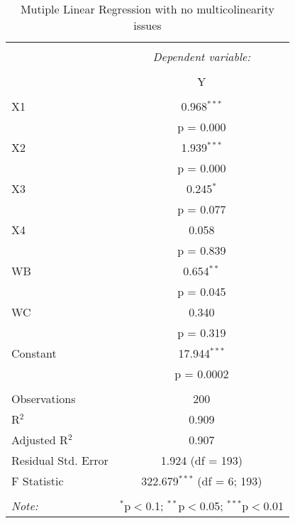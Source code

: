 
\begin{table}[!htbp] \centering 
  \caption{Mutiple Linear Regression with no multicolinearity issues } 
  \label{tab::multi_fixed_1} 
\begin{tabular}{@{\extracolsep{5pt}}lc} 
\\[-1.8ex]\hline 
\hline \\[-1.8ex] 
 & \multicolumn{1}{c}{\textit{Dependent variable:}} \\ 
\cline{2-2} 
\\[-1.8ex] & Y \\ 
\hline \\[-1.8ex] 
 X1 & 0.968$^{***}$ \\ 
  & p = 0.000 \\ 
  X2 & 1.939$^{***}$ \\ 
  & p = 0.000 \\ 
  X3 & 0.245$^{*}$ \\ 
  & p = 0.077 \\ 
  X4 & 0.058 \\ 
  & p = 0.839 \\ 
  WB & 0.654$^{**}$ \\ 
  & p = 0.045 \\ 
  WC & 0.340 \\ 
  & p = 0.319 \\ 
  Constant & 17.944$^{***}$ \\ 
  & p = 0.0002 \\ 
 \hline \\[-1.8ex] 
Observations & 200 \\ 
R$^{2}$ & 0.909 \\ 
Adjusted R$^{2}$ & 0.907 \\ 
Residual Std. Error & 1.924 (df = 193) \\ 
F Statistic & 322.679$^{***}$ (df = 6; 193) \\ 
\hline 
\hline \\[-1.8ex] 
\textit{Note:}  & \multicolumn{1}{r}{$^{*}$p$<$0.1; $^{**}$p$<$0.05; $^{***}$p$<$0.01} \\ 
\end{tabular} 
\end{table} 
